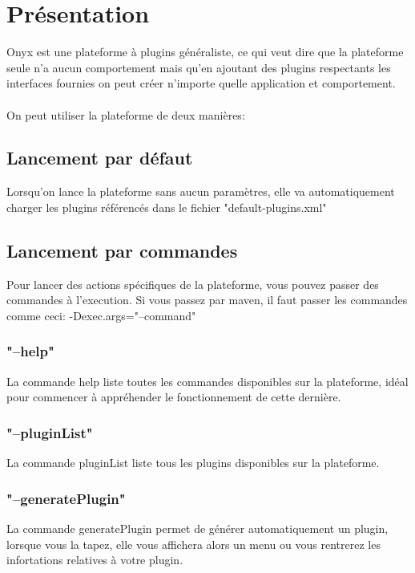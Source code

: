 \section{Présentation}

Onyx est une plateforme à plugins généraliste, ce qui veut dire que la plateforme seule n'a aucun comportement mais qu'en ajoutant des plugins respectants les interfaces fournies on peut créer n'importe quelle application et comportement.
\\
\\
On peut utiliser la plateforme de deux manières:


\subsection{Lancement par défaut}

Lorsqu'on lance la plateforme sans aucun paramètres, elle va automatiquement charger les plugins référencés dans le fichier "default-plugins.xml"

\subsection{Lancement par commandes}

Pour lancer des actions spécifiques de la plateforme, vous pouvez passer des commandes à l'execution. Si vous passez par maven, il faut passer les commandes comme ceci: -Dexec.args="--command"

\subsubsection{"--help"}
La commande help liste toutes les commandes disponibles sur la plateforme, idéal pour commencer à appréhender le fonctionnement de cette dernière.

\subsubsection{"--pluginList"}
La commande pluginList liste tous les plugins disponibles sur la plateforme.

\subsubsection{"--generatePlugin"}
La commande generatePlugin permet de générer automatiquement un plugin, lorsque vous la tapez, elle vous affichera alors un menu ou vous rentrerez les infortations relatives à votre plugin.

